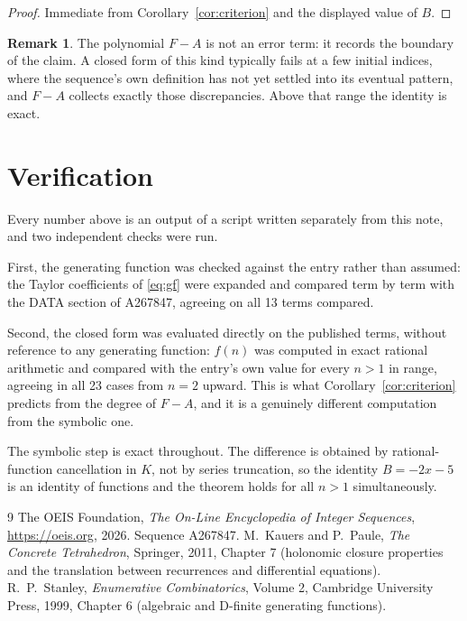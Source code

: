 \documentclass[11pt,a4paper]{article}
\theoremstyle{plain}
\theoremstyle{definition}
\newtheorem{remark}[theorem]{Remark}
\begin{document}
\begin{proof}
Immediate from Corollary~\ref{cor:criterion} and the displayed value of $B$.
\end{proof}

\begin{remark}
The polynomial $F-A$ is not an error term: it records the boundary of the claim. A closed
form of this kind typically fails at a few initial indices, where the sequence's own
definition has not yet settled into its eventual pattern, and $F-A$ collects exactly
those discrepancies. Above that range the identity is exact.
\end{remark}

\section{Verification}

Every number above is an output of a script written separately from this note, and two
independent checks were run.

First, the generating function was checked against the entry rather than assumed: the
Taylor coefficients of \eqref{eq:gf} were expanded and compared term by term with the DATA
section of A267847, agreeing on all 13 terms compared.

Second, the closed form was evaluated directly on the published terms, without reference
to any generating function: $f(n)$ was computed in exact rational arithmetic and compared
with the entry's own value for every $n>1$ in range, agreeing in all 23 cases
from $n=2$ upward. This is what Corollary~\ref{cor:criterion} predicts from the
degree of $F-A$, and it is a genuinely different computation from the symbolic one.

The symbolic step is exact throughout. The difference is obtained by rational-function
cancellation in $K$, not by series truncation, so the identity $B=- 2 x - 5$ is an
identity of functions and the theorem holds for all $n>1$ simultaneously.

\begin{thebibliography}{9}
 The OEIS Foundation, \emph{The On-Line Encyclopedia of Integer Sequences},
\url{https://oeis.org}, 2026. Sequence A267847.
 M.~Kauers and P.~Paule, \emph{The Concrete Tetrahedron}, Springer, 2011,
Chapter 7 (holonomic closure properties and the translation between recurrences and
differential equations).
 R.~P.~Stanley, \emph{Enumerative Combinatorics}, Volume 2, Cambridge
University Press, 1999, Chapter 6 (algebraic and D-finite generating functions).
\end{thebibliography}
\end{document}
